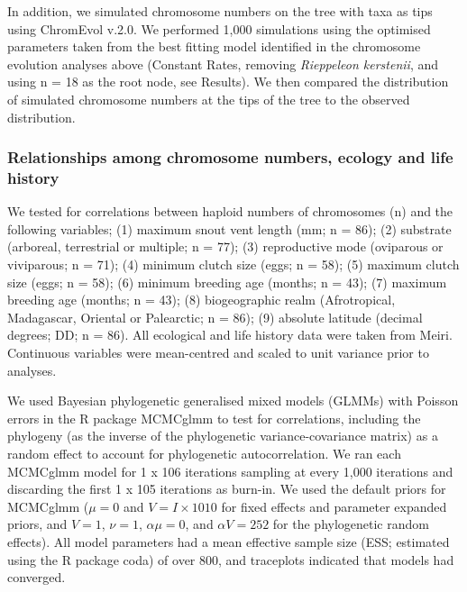 \documentclass[a4paper, 12pt]{article}
\begin{document}
In addition, we simulated chromosome numbers on the tree with taxa as tips using ChromEvol v.2.0\cite{glick2014chromevol,mayrose2010probabilistic}. 
We performed 1,000 simulations using the optimised parameters taken from the best fitting model identified in the chromosome evolution analyses above (Constant Rates, removing \textit{Rieppeleon kerstenii}, and using n = 18 as the root node, see Results). 
We then compared the distribution of simulated chromosome numbers at the tips of the tree to the observed distribution. 

\subsubsection{Relationships among chromosome numbers, ecology and life history}

We tested for correlations between haploid numbers of chromosomes (n) and the following variables; (1) maximum snout vent length (mm; n = 86); (2) substrate (arboreal, terrestrial or multiple; n = 77); (3) reproductive mode (oviparous or viviparous; n = 71); (4) minimum clutch size (eggs; n = 58); (5) maximum clutch size (eggs; n = 58); (6) minimum breeding age (months; n = 43); (7) maximum breeding age (months; n = 43); (8) biogeographic realm (Afrotropical, Madagascar, Oriental or Palearctic; n = 86); (9) absolute latitude (decimal degrees; DD; n = 86). 
All ecological and life history data were taken from Meiri\cite{meiri2018traits}. 
Continuous variables were mean-centred and scaled to unit variance prior to analyses.

We used Bayesian phylogenetic generalised mixed models (GLMMs) with Poisson errors in the R package MCMCglmm\cite{hadfield2010mcmc} to test for correlations, including the phylogeny (as the inverse of the phylogenetic variance-covariance matrix) as a random effect to account for phylogenetic autocorrelation. 
We ran each MCMCglmm model for 1 x 106 iterations sampling at every 1,000 iterations and discarding the first 1 x 105 iterations as burn-in. 
We used the default priors for MCMCglmm ($μ = 0$ and $V = I × 1010$ for fixed effects and parameter expanded priors, and $V = 1$, $\nu = 1$, $\alpha \mu = 0$, and $\alpha V = 252$ for the phylogenetic random effects). 
All model parameters had a mean effective sample size (ESS; estimated using the R package coda\cite{plummer2006coda}) of over 800, and traceplots indicated that models had converged.

\end{document}
